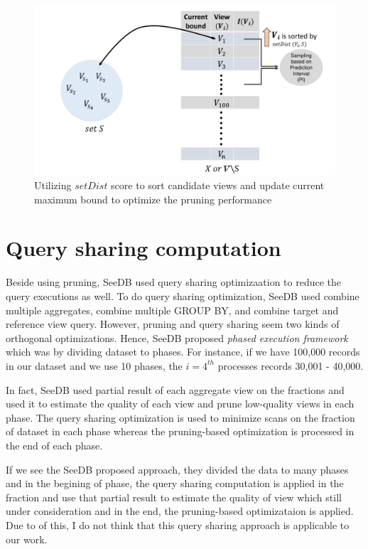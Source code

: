 \documentclass{article}
\begin{document}
\begin{figure}
	\begin{center}
		\includegraphics[width=5.0in]{figures/Algorithm}
		\vspace{-12pt}
		\caption{Utilizing $setDist$ score to sort candidate views and update current maximum bound to optimize the pruning performance}
		\label{fig:algorithm-figure}
		
	\end{center}
\end{figure}


\section{Query sharing computation}

Beside using pruning, SeeDB used query sharing optimizaation to reduce the query executions as well. To do query sharing optimization, SeeDB used combine multiple aggregates, combine multiple GROUP BY, and combine target and reference view query. However, pruning and query sharing seem two kinds of orthogonal optimizations. Hence, SeeDB proposed \textit{phased execution framework} which was by dividing dataset to phases. For instance, if we have 100,000 records in our dataset and we use 10 phases, the $i = 4^{th}$ processes records 30,001 - 40,000. 

In fact, SeeDB used partial result of each aggregate view on the fractions and used it to estimate the quality of each view and prune low-quality views in each phase. The query sharing optimization is used to minimize scans on the fraction of dataset in each phase whereas the pruning-based optimization is processed in the end of each phase.

If we see the SeeDB proposed approach, they divided the data to many phases and in the begining of phase, the query sharing computation is applied in the fraction and use that partial result to estimate the quality of view which still under consideration and in the end, the pruning-based optimizataion is applied. Due to of this, I do not think that this query sharing approach is applicable to our work. 
\end{document}
